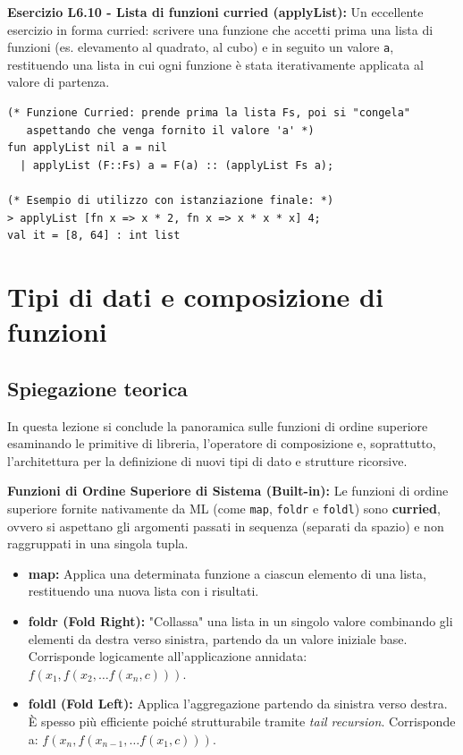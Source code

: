 \documentclass[12pt, a4paper]{article}
\begin{document}
\textbf{Esercizio L6.10 - Lista di funzioni curried (applyList):}
Un eccellente esercizio in forma curried: scrivere una funzione che accetti prima una lista di funzioni (es. elevamento al quadrato, al cubo) e in seguito un valore \texttt{a}, restituendo una lista in cui ogni funzione è stata iterativamente applicata al valore di partenza.

\begin{verbatim}
(* Funzione Curried: prende prima la lista Fs, poi si "congela"
   aspettando che venga fornito il valore 'a' *)
fun applyList nil a = nil
  | applyList (F::Fs) a = F(a) :: (applyList Fs a);

(* Esempio di utilizzo con istanziazione finale: *)
> applyList [fn x => x * 2, fn x => x * x * x] 4;
val it = [8, 64] : int list
\end{verbatim}

\section{Tipi di dati e composizione di funzioni}

\subsection{Spiegazione teorica}
In questa lezione si conclude la panoramica sulle funzioni di ordine superiore esaminando le primitive di libreria, l'operatore di composizione e, soprattutto, l'architettura per la definizione di nuovi tipi di dato e strutture ricorsive.

\textbf{Funzioni di Ordine Superiore di Sistema (Built-in):}
Le funzioni di ordine superiore fornite nativamente da ML (come \texttt{map}, \texttt{foldr} e \texttt{foldl}) sono \textbf{curried}, ovvero si aspettano gli argomenti passati in sequenza (separati da spazio) e non raggruppati in una singola tupla.
\begin{itemize}
    \item \textbf{map:} Applica una determinata funzione a ciascun elemento di una lista, restituendo una nuova lista con i risultati.
    \item \textbf{foldr (Fold Right):} "Collassa" una lista in un singolo valore combinando gli elementi da destra verso sinistra, partendo da un valore iniziale base. Corrisponde logicamente all'applicazione annidata: $f(x_1, f(x_2, \dots f(x_n, c)))$.
    \item \textbf{foldl (Fold Left):} Applica l'aggregazione partendo da sinistra verso destra. È spesso più efficiente poiché strutturabile tramite \textit{tail recursion}. Corrisponde a: $f(x_n, f(x_{n-1}, \dots f(x_1, c)))$.
\end{itemize}
\end{document}
